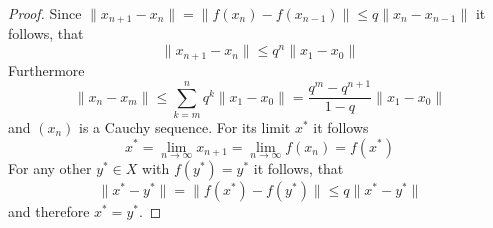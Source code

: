 \begin{proof}
    Since \( \| x_{n+1} - x_n\| =\| f(x_n) - f(x_{n-1})\| \le q\| x_n - x_{n-1}\| \) it follows, that
    \[
        \| x_{n+1} - x_n\| \le q^n  \|x_1 - x_0\|
    \]
    Furthermore
    \[
        \| x_n - x_m\| \le \sum_{k=m}^n q^k \|x_1 - x_0\| = \frac{q^m - q^{n+1}}{1 - q} \|x_1 - x_0\|
    \]
    and \( (x_n) \) is a Cauchy sequence. For its limit \( x^* \) it follows
    \[
        x^* = \lim_{n\to\infty} x_{n+1} = \lim_{n\to\infty} f(x_n) = f(x^*)
    \]
    For any other \( y^* \in X \) with \( f(y^*) = y^* \) it follows, that
    \[
        \|x^* - y^*\| = \|f(x^*) - f(y^*)\| \le q \|x^* - y^*\|
    \]
    and therefore \( x^* = y^*\).

\end{proof}
\bigskip

